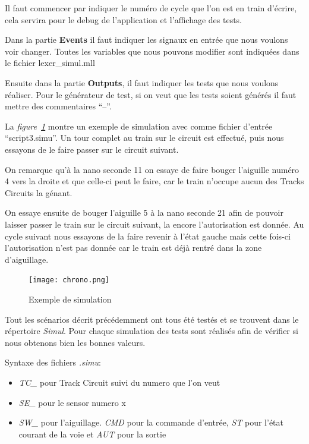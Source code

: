 \medskip

Il faut commencer par indiquer le numéro de cycle que l'on est en train
d'écrire, cela servira pour le debug de l'application et l'affichage
des tests.

\medskip

Dans la partie \textbf{Events} il faut indiquer les signaux en entrée que nous
voulons voir changer. Toutes les variables que nous pouvons modifier
sont indiquées dans le fichier lexer\_simul.mll 

\medskip

Ensuite dans la partie \textbf{Outputs}, il faut indiquer les tests
que nous voulons réaliser.
Pour le générateur de test, si on veut que les tests soient générés il
faut mettre des commentaires ``--''.

\bigskip

La \emph{figure~\ref{simul}}  montre un exemple de simulation avec comme
fichier d'entrée ``script3.simu''.
Un tour complet au train sur le circuit est effectué, puis nous
essayons de le faire passer sur le circuit suivant.

On remarque qu'à la nano seconde 11 on essaye de faire bouger
l'aiguille numéro 4 vers la droite et que celle-ci peut le faire, car le train
n'occupe aucun des Tracks Circuits la génant.

On essaye ensuite de bouger l'aiguille 5 à la nano seconde 21 afin de
pouvoir laisser passer le train sur le circuit suivant, la encore
l'autorisation est donnée.
Au cycle suivant nous essayons de la faire revenir à l'état
gauche mais cette fois-ci l'autorisation n'est pas donnée car le train est déjà
rentré dans la zone d'aiguillage.

\newpage

\begin{figure}[h]
\centering
\texttt{[image: chrono.png]}
\caption{Exemple de simulation}
\label{simul}
\end{figure}

\bigskip

Tout les scénarios décrit précédemment ont tous été testés et se trouvent
dans le répertoire \emph{Simul}.
Pour chaque simulation des tests sont réalisés afin de vérifier si nous
obtenons bien les bonnes valeurs.

\medskip

Syntaxe des fichiers \emph{.simu}:

\begin{itemize}
  \item \emph{TC\_} pour Track Circuit suivi du numero que l'on veut
  \item \emph{SE\_} pour le sensor numero x
  \item \emph{SW\_} pour l'aiguillage. \emph{CMD} pour la commande d'entrée, \emph{ST} pour
    l'état courant de la voie et \emph{AUT} pour la sortie
\end{itemize}

